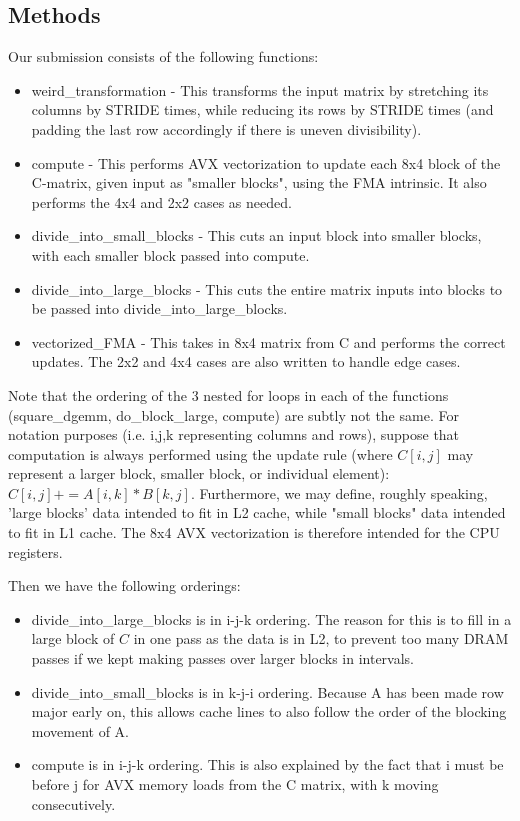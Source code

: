 \documentclass[12pt]{article}
\begin{document}
\subsection{Methods}
Our submission consists of the following functions:
\begin{itemize}
\item weird\_transformation - This transforms the input matrix by stretching its columns by STRIDE times, while reducing its rows by STRIDE times (and padding the last row accordingly if there is uneven divisibility).
\item compute - This performs AVX vectorization to update each 8x4 block of the C-matrix, given input as "smaller blocks", using the FMA intrinsic. It also performs the 4x4 and 2x2 cases as needed. 
\item divide\_into\_small\_blocks - This cuts an input block into smaller blocks, with each smaller block passed into compute. 
\item divide\_into\_large\_blocks - This cuts the entire matrix inputs into blocks to be passed into divide\_into\_large\_blocks. 
\item vectorized\_FMA - This takes in 8x4 matrix from C and performs the correct updates. The 2x2 and 4x4 cases are also written to handle edge cases. 
\end{itemize}
Note that the ordering of the 3 nested for loops in each of the functions (square\_dgemm, do\_block\_large, compute) are subtly not the same. For notation purposes (i.e. i,j,k representing columns and rows), suppose that computation is always performed using the update rule (where $C[i,j]$ may represent a larger block, smaller block, or individual element): $C[i,j] += A[i, k]*B[k, j]$. Furthermore, we may define, roughly speaking, 'large blocks' data intended to fit in L2 cache, while "small blocks" data intended to fit in L1 cache. The 8x4 AVX vectorization is therefore intended for the CPU registers. 

Then we have the following orderings: 
\begin{itemize}
\item divide\_into\_large\_blocks is in i-j-k ordering. The reason for this is to fill in a large block of $C$ in one pass as the data is in L2, to prevent too many DRAM passes if we kept making passes over larger blocks in intervals.  
\item divide\_into\_small\_blocks is in k-j-i ordering. Because A has been made row major early on, this allows cache lines to also follow the order of the blocking movement of A. 
\item compute is in i-j-k ordering. This is also explained by the fact that i must be before j for AVX memory loads from the C matrix, with k moving consecutively. 
\end{itemize}
\end{document}
